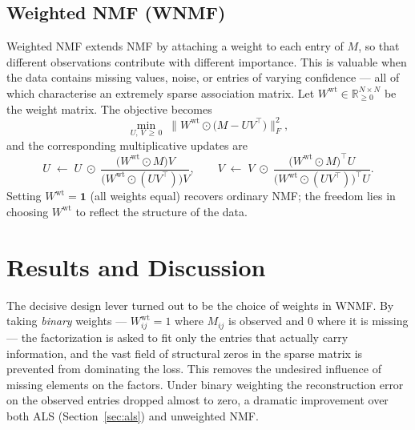 \subsection{Weighted NMF (WNMF)}
\label{sec:wnmf}
Weighted NMF extends NMF by attaching a weight to each entry of $M$, so that
different observations contribute with different importance. This is valuable
when the data contains missing values, noise, or entries of varying
confidence --- all of which characterise an extremely sparse association
matrix. Let $W^{\mathrm{wt}} \in \mathbb{R}^{N\times N}_{\ge 0}$ be the weight
matrix. The objective becomes
\begin{equation}
  \label{eq:wnmf-obj}
  \min_{U,\,V \,\ge\, 0}\;
    \bigl\| W^{\mathrm{wt}} \odot \bigl(M - U V^{\top}\bigr) \bigr\|_{F}^{2},
\end{equation}
and the corresponding multiplicative updates are
\begin{equation}
  \label{eq:wnmf-update}
  U \;\leftarrow\; U \;\odot\;
    \frac{\bigl(W^{\mathrm{wt}}\odot M\bigr) V}
         {\bigl(W^{\mathrm{wt}}\odot (U V^{\top})\bigr) V},
  \qquad
  V \;\leftarrow\; V \;\odot\;
    \frac{\bigl(W^{\mathrm{wt}}\odot M\bigr)^{\top} U}
         {\bigl(W^{\mathrm{wt}}\odot (U V^{\top})\bigr)^{\top} U}.
\end{equation}
Setting $W^{\mathrm{wt}} = \mathbf{1}$ (all weights equal) recovers ordinary
NMF; the freedom lies in choosing $W^{\mathrm{wt}}$ to reflect the structure of
the data.

\section{Results and Discussion}
\label{sec:mf-results}

The decisive design lever turned out to be the choice of weights in WNMF. By
taking \emph{binary} weights --- $W^{\mathrm{wt}}_{ij} = 1$ where $M_{ij}$ is
observed and $0$ where it is missing --- the factorization is asked to fit only
the entries that actually carry information, and the vast field of structural
zeros in the sparse matrix is prevented from dominating the loss. This removes
the undesired influence of missing elements on the factors. Under binary
weighting the reconstruction error on the observed entries dropped almost to
zero, a dramatic improvement over both ALS (Section~\ref{sec:als}) and
unweighted NMF.


